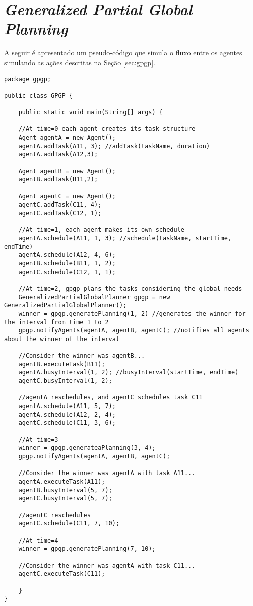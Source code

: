 \section{\textit{Generalized Partial Global Planning}}\label{appendix:gpgp}

A seguir é apresentado um pseudo-código que simula o fluxo entre os agentes simulando as ações descritas na Seção \ref{sec:gpgp}.

\begin{lstlisting}
package gpgp;

public class GPGP {

	public static void main(String[] args) {

	//At time=0 each agent creates its task structure
	Agent agentA = new Agent();
	agentA.addTask(A11, 3); //addTask(taskName, duration)
	agentA.addTask(A12,3);
	
	Agent agentB = new Agent();
	agentB.addTask(B11,2);
	
	Agent agentC = new Agent();
	agentC.addTask(C11, 4);
	agentC.addTask(C12, 1);
		
	//At time=1, each agent makes its own schedule
	agentA.schedule(A11, 1, 3); //schedule(taskName, startTime, endTime)
	agentA.schedule(A12, 4, 6);
	agentB.schedule(B11, 1, 2);
	agentC.schedule(C12, 1, 1);
	
	//At time=2, gpgp plans the tasks considering the global needs
	GeneralizedPartialGlobalPlanner gpgp = new GeneralizedPartialGlobalPlanner();
	winner = gpgp.generatePlanning(1, 2) //generates the winner for the interval from time 1 to 2
	gpgp.notifyAgents(agentA, agentB, agentC); //notifies all agents about the winner of the interval

	//Consider the winner was agentB...
	agentB.executeTask(B11);
	agentA.busyInterval(1, 2); //busyInterval(startTime, endTime)
	agentC.busyInterval(1, 2);
	
	//agentA reschedules, and agentC schedules task C11 
	agentA.schedule(A11, 5, 7);
	agentA.schedule(A12, 2, 4);
	agentC.schedule(C11, 3, 6);
	
	//At time=3
	winner = gpgp.generateaPlanning(3, 4);
	gpgp.notifyAgents(agentA, agentB, agentC);
	
	//Consider the winner was agentA with task A11...
	agentA.executeTask(A11);
	agentB.busyInterval(5, 7);
	agentC.busyInterval(5, 7);
	
	//agentC reschedules
	agentC.schedule(C11, 7, 10);
	
	//At time=4
	winner = gpgp.generatePlanning(7, 10);
	
	//Consider the winner was agentA with task C11...
	agentC.executeTask(C11);
	
	}
}
\end{lstlisting}